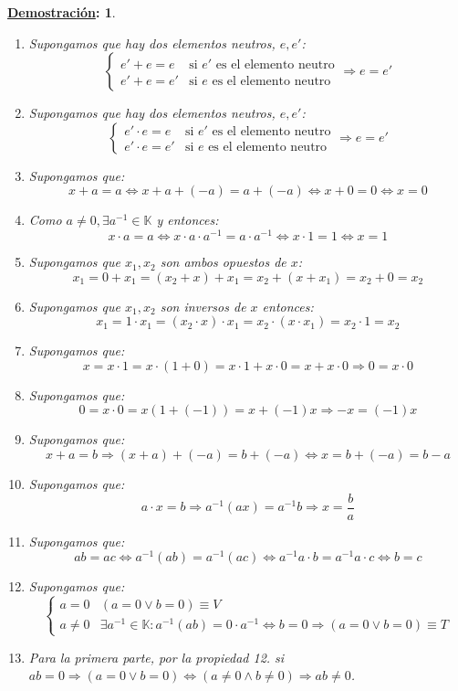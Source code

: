 \documentclass[10pt,a4paper,openright]{book}
\theoremstyle{break}
\newtheorem*{demo}{\underline{Demostración}:}
\begin{document}
\begin{demo}
\begin{enumerate}
\item Supongamos que hay dos elementos neutros, $e, e'$:
 \begin{equation*}
 \begin{cases}
 e'+e=e & \mbox{si } e'\mbox{ es el elemento neutro} \\
 e'+e=e' & \mbox{si } e \mbox{ es el elemento neutro}
 \end{cases}
 \Rightarrow e=e'
 \end{equation*}
\item Supongamos que hay dos elementos neutros, $e, e'$:
 \begin{equation*}
 \begin{cases}
 e'\cdot e=e & \mbox{si } e'\mbox{ es el elemento neutro} \\
 e'\cdot e=e' & \mbox{si } e \mbox{ es el elemento neutro}
 \end{cases}
 \Rightarrow e=e'
 \end{equation*}
\item Supongamos que:
$$x+a=a\Leftrightarrow x+a+(-a)=a+(-a)\Leftrightarrow x+0=0 \Leftrightarrow x=0$$
\item Como $a\neq 0, \exists a^{-1}\in \mathbb K$ y entonces:
$$x\cdot a=a \Leftrightarrow x\cdot a \cdot a^{-1}=a\cdot a^{-1}\Leftrightarrow x\cdot 1=1 \Leftrightarrow x=1$$
\item Supongamos que $x_1, x_2$ son ambos opuestos de $x$:
$$x_1=0+x_1=(x_2+x)+x_1=x_2+(x+x_1)=x_2+0=x_2$$
\item Supongamos que $x_1, x_2$ son inversos de $x$ entonces:
$$x_1=1\cdot x_1=(x_2\cdot x)\cdot x_1=x_2\cdot (x\cdot x_1)=x_2\cdot 1=x_2$$
\item Supongamos que:
$$x=x\cdot 1=x\cdot (1+0)=x\cdot 1+ x\cdot 0=x+ x\cdot 0 \Rightarrow 0=x\cdot 0$$
\item Supongamos que:
$$0=x\cdot 0=x(1+(-1))=x+(-1)x \Rightarrow -x=(-1)x$$
\item Supongamos que:
$$x+a=b \Rightarrow (x+a)+(-a)=b+(-a)\Leftrightarrow x=b+(-a)=b-a$$
\item Supongamos que:
$$a\cdot x=b \Rightarrow a^{-1}(ax)=a^{-1}b \Rightarrow x=\frac{b}{a}$$
\item Supongamos que:
$$ab=ac \Leftrightarrow a^{-1}(ab)=a^{-1}(ac) \Leftrightarrow a^{-1}a\cdot b=a^{-1}a\cdot c \Leftrightarrow b=c$$
\item Supongamos que:
\begin{equation*}
\begin{cases}
a=0 & (a=0\vee b=0) \equiv V \\
a\neq 0 & \exists a^{-1}\in \mathbb K : a^{-1}(ab)=0\cdot a^{-1}\Leftrightarrow b=0\Rightarrow (a=0 \vee b=0)\equiv T
\end{cases} 
\end{equation*}
\item Para la primera parte, por la propiedad 12. si $ab=0\Rightarrow (a=0\vee b=0)\Leftrightarrow (a\neq 0 \wedge b\neq 0) \Rightarrow ab\neq 0$.


\end{enumerate}
\end{demo}
\end{document}
